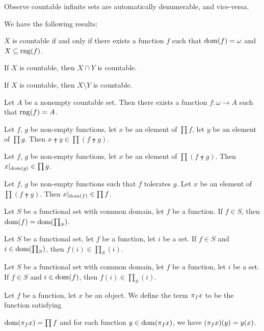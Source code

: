 \documentclass{article}
\begin{document}
Observe countable infinite sets are automatically denumerable, and vice-versa.

We have the following results:
\begin{thm}
\item\label{card3:93} $X$ is countable if and only if there exists a
  function $f$ such that $\operatorname{dom}(f)=\omega$ and $X\subseteq\operatorname{rng}(f)$.
\item\label{card3:94} If $X$ is countable, then $X\cap Y$ is countable.
\item\label{card3:95} If $X$ is countable, then $X\setminus Y$ is countable.
\item\label{card3:96} Let $A$ be a nonempty countable set. Then there exists
  a function $f\colon\omega\to A$ such that $\operatorname{rng}(f)=A$.
\item\label{card3:97} Let $f$, $g$ be non-empty functions, let $x$ be an
  element of $\prod f$, let $y$ be an element of $\prod g$.
  Then $x\plusdot y\in\prod(f\plusdot g)$.
\item\label{card3:98} Let $f$, $g$ be non-empty functions, let $x$ be an
  element of $\prod(f\plusdot g)$.
  Then $x|_{\operatorname{dom}(g)}\in\prod g$.
\item\label{card3:99} Let $f$, $g$ be non-empty functions such that $f$
  tolerates $g$. Let $x$ be an element of $\prod(f\plusdot g)$.
  Then $x|_{\operatorname{dom}(f)}\in\prod f$.
\item\label{card3:100} Let $S$ be a functional set with common domain,
  let $f$ be a function. If $f\in S$, then $\operatorname{dom}(f)=\operatorname{dom}({\prod}_{S})$.
\item\label{card3:101} Let $S$ be a functional set, let $f$ be a
  function, let $i$ be a set. If $f\in S$ and $i\in\operatorname{dom}({\prod}_{S})$,
  then $f(i)\in{\prod}_{S}(i)$.
\item\label{card3:102} Let $S$ be a functional set with common domain,
  let $f$ be a function, let $i$ be a set.
  If $f\in S$ and $i\in\operatorname{dom}(f)$, then $f(i)\in{\prod}_{S}(i)$.
\end{thm}

\begin{definition}
Let $f$ be a function, let $x$ be an object. We define the term
$\pi_{f}{x}$ to be the function satisfying
\begin{defn}
\item $\operatorname{dom}(\pi_{f}{x})=\prod f$ and for each function $y\in\operatorname{dom}(\pi_{f}{x})$,
  we have $(\pi_{f}{x})(y)=y(x)$.
\end{defn}
\end{definition}
\end{document}
